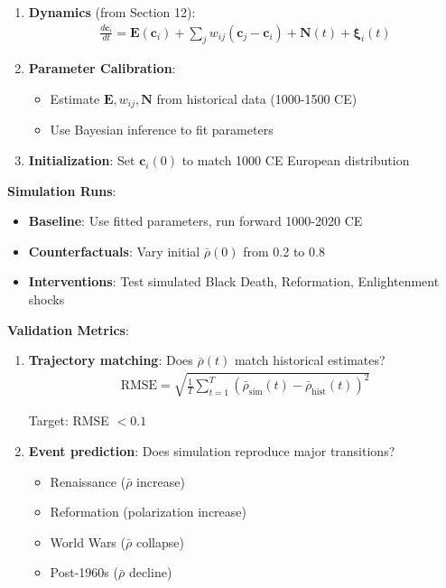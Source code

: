 \documentclass[11pt,a4paper]{article}
\theoremstyle{definition}
\theoremstyle{remark}
\newcommand{\EE}{\mathbf{E}}
\newcommand{\cc}{\mathbf{c}}
\begin{document}
\begin{enumerate}
\begin{protocol}
\begin{enumerate}
    \item \textbf{Dynamics} (from Section 12):
        \begin{align}
        \frac{d\cc_i}{dt} = \EE(\cc_i) + \sum_j w_{ij}(\cc_j - \cc_i) + \mathbf{N}(t) + \boldsymbol{\xi}_i(t)
        \end{align}
    
    \item \textbf{Parameter Calibration}:
        \begin{itemize}
            \item Estimate \(\EE, w_{ij}, \mathbf{N}\) from historical data (1000-1500 CE)
            \item Use Bayesian inference to fit parameters
        \end{itemize}
    
    \item \textbf{Initialization}: Set \(\cc_i(0)\) to match 1000 CE European distribution
\end{enumerate}

\textbf{Simulation Runs}:
\begin{itemize}
    \item \textbf{Baseline}: Use fitted parameters, run forward 1000-2020 CE
    \item \textbf{Counterfactuals}: Vary initial \(\bar{\rho}(0)\) from 0.2 to 0.8
    \item \textbf{Interventions}: Test simulated Black Death, Reformation, Enlightenment shocks
\end{itemize}

\textbf{Validation Metrics}:
\begin{enumerate}
    \item \textbf{Trajectory matching}: Does \(\bar{\rho}(t)\) match historical estimates?
        \begin{align}
        \text{RMSE} = \sqrt{\frac{1}{T}\sum_{t=1}^T (\bar{\rho}_{\text{sim}}(t) - \bar{\rho}_{\text{hist}}(t))^2}
        \end{align}
        
        Target: RMSE \(< 0.1\)
    
    \item \textbf{Event prediction}: Does simulation reproduce major transitions?
        \begin{itemize}
            \item Renaissance (\(\bar{\rho}\) increase)
            \item Reformation (polarization increase)
            \item World Wars (\(\bar{\rho}\) collapse)
            \item Post-1960s (\(\bar{\rho}\) decline)
        \end{itemize}
    

\end{enumerate}
\end{protocol}
\end{enumerate}
\end{document}
